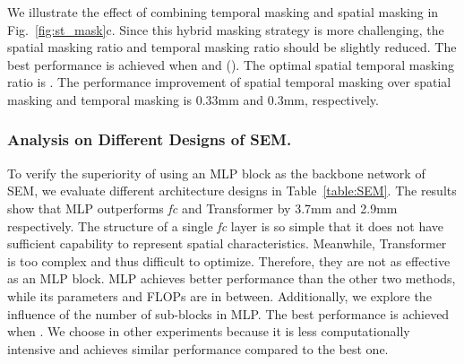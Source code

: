 \documentclass[]{llncs}
\begin{document}
We illustrate the effect of combining temporal masking and spatial masking in Fig.~\ref{fig:st_mask}c. Since this hybrid masking strategy is more challenging, the spatial masking ratio and temporal masking ratio should be slightly reduced. The best performance is achieved when  and  (). The optimal spatial temporal masking ratio is . The performance improvement of spatial temporal masking over spatial masking and temporal masking is 0.33mm and 0.3mm, respectively.

\subsubsection{Analysis on Different Designs of SEM.} 
To verify the superiority of using an MLP block as the backbone network of SEM, we evaluate different architecture designs in Table~\ref{table:SEM}. The results show that MLP outperforms \emph{fc} and Transformer by 3.7mm and 2.9mm respectively. The structure of a single \emph{fc} layer is so simple that it does not have sufficient capability to represent spatial characteristics. Meanwhile, Transformer is too complex and thus difficult to optimize. Therefore, they are not as effective as an MLP block. MLP achieves better performance than the other two methods, while its parameters and FLOPs are in between. Additionally, we explore the influence of the number of sub-blocks  in MLP. The best performance is achieved when . We choose  in other experiments because it is less computationally intensive and achieves similar performance compared to the best one. 
\end{document}
